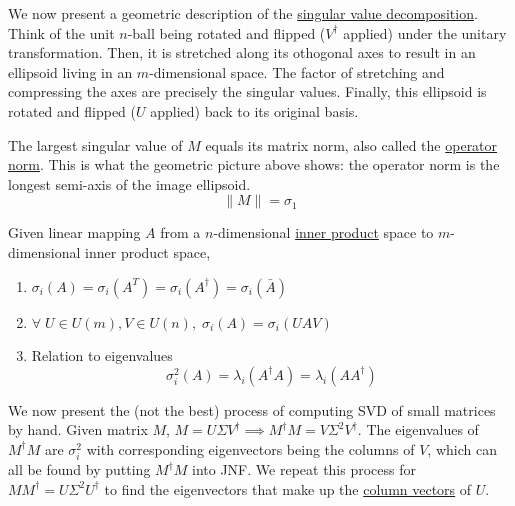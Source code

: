   We now present a geometric description of the \hyperref[thm:singular-value-decomposition]{singular value decomposition}. Think of the unit $n$-ball being rotated and flipped ($V^\dagger$ applied) under the unitary transformation. Then, it is stretched along its othogonal axes to result in an ellipsoid living in an $m$-dimensional space. The factor of stretching and compressing the axes are precisely the singular values. Finally, this ellipsoid is rotated and flipped ($U$ applied) back to its original basis. 

  \begin{theorem}
    \label{thm:operator-norm-as-the-largest-singular-value}
    The largest singular value of $M$ equals its matrix norm, also called the \hyperref[def:operator-norm]{operator norm}. This is what the geometric picture above shows: the operator norm is the longest semi-axis of the image ellipsoid. 
    \begin{equation}
      \|M\| = \sigma_1
    \end{equation}
  \end{theorem}

  \begin{theorem}
    \label{thm:properties-of-singular-values}
 
    Given linear mapping $A$ from a $n$-dimensional \hyperref[def:inner-product]{inner product} space to $m$-dimensional inner product space, 
    \begin{enumerate}
      \item $\sigma_i(A) = \sigma_i (A^T) = \sigma_i (A^\dagger) = \sigma_i (\bar{A})$

      \item $\forall \; U \in U(m), V \in U(n), \; \sigma_i (A) = \sigma_i (U A V)$

      \item Relation to eigenvalues
      \begin{equation}
        \sigma_i^2(A) = \lambda_i (A^\dagger A) = \lambda_i (A A^\dagger)
      \end{equation}
    \end{enumerate}
  \end{theorem}

  We now present the (not the best) process of computing SVD of small matrices by hand. Given matrix $M$, $M = U \Sigma V^\dagger \implies M^\dagger M = V \Sigma^2 V^\dagger$. The eigenvalues of $M^\dagger M$ are $\sigma_i^2$ with corresponding eigenvectors being the columns of $V$, which can all be found by putting $M^\dagger M$ into JNF. We repeat this process for $M M^\dagger = U \Sigma^2 U^\dagger$ to find the eigenvectors that make up the \hyperref[def:column-vector]{column vectors} of $U$. 

